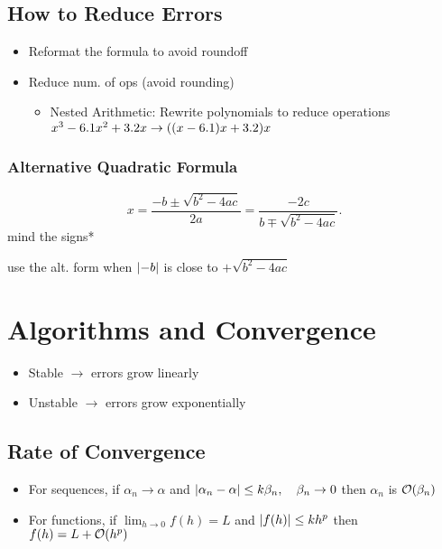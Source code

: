 \documentclass[9pt, letterpaper]{extarticle}
\begin{document}
\begin{multicols*}{3}
  \subsection{How to Reduce Errors}
  \begin{itemize}
    \item Reformat the formula to avoid roundoff
    \item Reduce num. of ops (avoid rounding)
      \begin{itemize}
        \item Nested Arithmetic: Rewrite polynomials to reduce operations
          \newline
          $x^3 - 6.1x^2 + 3.2x \to \pqty{\pqty{x-6.1}x + 3.2}x$
      \end{itemize}
  \end{itemize}

  \subsubsection{Alternative Quadratic Formula}
  \begin{equation*}
  x = \frac{-b \pm \sqrt{b^2 - 4ac}}{2a} = \frac{-2c}{b \mp \sqrt{b^2 - 4ac}}  
  .\end{equation*}
  \tiny *mind the signs*

  \normalsize
  use the alt. form when $\abs{-b}$ is close to $+ \sqrt{b^2 - 4ac}$

  \section{Algorithms and Convergence}
  \begin{itemize}
    \item Stable $\to$ errors grow linearly
    \item Unstable $\to$ errors grow exponentially
  \end{itemize}

  \subsection{Rate of Convergence}
  \begin{itemize}
    \item For sequences, if $\alpha_n \to \alpha$ and $\abs{\alpha_n - \alpha}
      \leq k \beta_n, \quad \beta_n \to 0$ then $\alpha_n$ is $\order{\beta_n}$
    \item For functions, if $\lim_{h \to 0} f(h) = L$ and $\abs{f(h)} \leq kh^p$
      then $f(h) = L + \order{h^p}$
  \end{itemize}


\end{multicols*}
\end{document}
